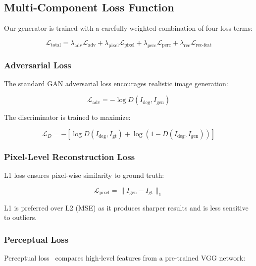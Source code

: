 \documentclass[journal]{IEEEtran}
\begin{document}
\subsection{Multi-Component Loss Function}

Our generator is trained with a carefully weighted combination of four loss terms:

\begin{equation}
\mathcal{L}_{\text{total}} = \lambda_{\text{adv}}\mathcal{L}_{\text{adv}} + \lambda_{\text{pixel}}\mathcal{L}_{\text{pixel}} + \lambda_{\text{perc}}\mathcal{L}_{\text{perc}} + \lambda_{\text{rec}}\mathcal{L}_{\text{rec-feat}}
\end{equation}

\subsubsection{Adversarial Loss}

The standard GAN adversarial loss encourages realistic image generation:

\begin{equation}
\mathcal{L}_{\text{adv}} = -\log D(I_{\text{deg}}, I_{\text{gen}})
\end{equation}

The discriminator is trained to maximize:

\begin{equation}
\mathcal{L}_D = -[\log D(I_{\text{deg}}, I_{\text{gt}}) + \log(1 - D(I_{\text{deg}}, I_{\text{gen}}))]
\end{equation}

\subsubsection{Pixel-Level Reconstruction Loss}

L1 loss ensures pixel-wise similarity to ground truth:

\begin{equation}
\mathcal{L}_{\text{pixel}} = \|I_{\text{gen}} - I_{\text{gt}}\|_1
\end{equation}

L1 is preferred over L2 (MSE) as it produces sharper results and is less sensitive to outliers.

\subsubsection{Perceptual Loss}

Perceptual loss~\cite{johnson2016perceptual} compares high-level features from a pre-trained VGG network:
\end{document}
